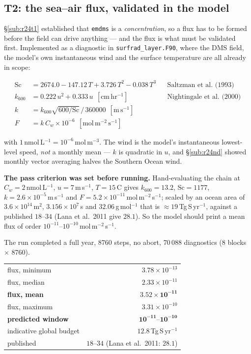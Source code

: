 \documentclass[10pt]{article}
\begin{document}
\subsection{T2: the sea--air flux, validated in the model}\label{sub:r24t2}
\S\ref{sub:r24t1} established that \texttt{emdms} is a \emph{concentration}, so a flux has to
be formed before the field can drive anything --- and the flux is what must be validated
first. Implemented as a diagnostic in \texttt{surfrad\_layer.F90}, where the DMS field, the
model's own instantaneous wind and the surface temperature are all already in scope:

\begin{align*}
\mathrm{Sc} &= 2674.0 - 147.12\,T + 3.726\,T^2 - 0.038\,T^3 &&\text{Saltzman et al.\ (1993)}\\
k_{600} &= 0.222\,u^2 + 0.333\,u \ \ [\mathrm{cm\,hr^{-1}}] &&\text{Nightingale et al.\ (2000)}\\
k &= k_{600}\sqrt{600/\mathrm{Sc}}\,/\,360000 \ \ [\mathrm{m\,s^{-1}}] \\
F &= k\,C_w\times10^{-6} \ \ [\mathrm{mol\,m^{-2}\,s^{-1}}]
\end{align*}

\noindent with $1$\,nmol\,L$^{-1}=10^{-6}$\,mol\,m$^{-3}$. The wind is the model's
instantaneous lowest-level speed, \emph{not} a monthly mean --- $k$ is quadratic in $u$, and
\S\ref{sub:r24nd} showed monthly vector averaging halves the Southern Ocean wind.

\textbf{The pass criterion was set before running.} Hand-evaluating the chain at
$C_w=2$\,nmol\,L$^{-1}$, $u=7$\,m\,s$^{-1}$, $T=15$\,\textdegree C gives $k_{600}=13.2$,
$\mathrm{Sc}=1177$, $k=2.6\times10^{-5}$\,m\,s$^{-1}$ and
$F=5.2\times10^{-11}$\,mol\,m$^{-2}$\,s$^{-1}$; scaled by an ocean area of
$3.6\times10^{14}$\,m$^2$, $3.156\times10^{7}$\,s and $32.06$\,g\,mol$^{-1}$ that is
${\approx}19$\,Tg\,S\,yr$^{-1}$, against a published $18$--$34$ (Lana et al.\ 2011 give
$28.1$). So the model should print a mean flux of order
$10^{-11}$--$10^{-10}$\,mol\,m$^{-2}$\,s$^{-1}$.

The run completed a full year, $8760$ steps, no abort, $70\,088$ diagnostics
(8 blocks $\times$ 8760).

\begin{center}\footnotesize
\begin{tabular}{l r}
\toprule
flux, minimum & $3.78\times10^{-13}$ \\
flux, median & $2.33\times10^{-11}$ \\
\textbf{flux, mean} & $\mathbf{3.52\times10^{-11}}$ \\
flux, maximum & $3.31\times10^{-10}$ \\
\midrule
\textbf{predicted window} & $\mathbf{10^{-11}}$--$\mathbf{10^{-10}}$ \\
indicative global budget & $12.8$\,Tg\,S\,yr$^{-1}$ \\
published & $18$--$34$ (Lana et al.\ 2011: $28.1$) \\
\bottomrule
\end{tabular}
\end{center}
\end{document}
